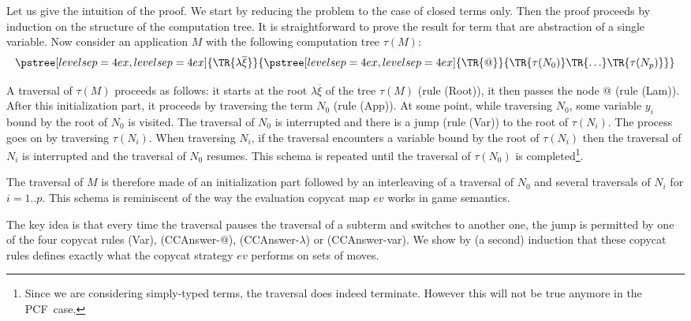 \documentclass{llncs}
\newcommand{\tree}[2][levelsep=4ex]{\pstree[levelsep=4ex,#1]{\TR{#2}}}
\newcommand\pcf{\textsf{PCF}}
\begin{document}
\begin{remark} Let us give the intuition of the proof.
    We start by reducing the problem to the case of closed terms only. Then the proof proceeds by induction on the structure of the computation tree.
    It is straightforward to prove the result for term that are abstraction of a single variable.
    Now consider an application $M$ with the following computation tree $\tau(M)$:
    $$ \tree[levelsep=4ex]{\lambda \overline{\xi}}
        { \tree[levelsep=4ex]{@}
            {   \TR{\tau(N_0)} \TR{\ldots} \TR{\tau(N_p)}}}
    $$

    A traversal of $\tau(M)$ proceeds as follows: it starts at the root $\lambda \overline{\xi}$ of the tree $\tau(M)$ (rule
    (Root)), it then passes the node @ (rule (Lam)).
    After this initialization part, it proceeds by traversing the term $N_0$ (rule (App)).
    At some point, while traversing $N_0$, some variable $y_i$ bound by the root of $N_0$ is visited. The traversal
    of $N_0$ is interrupted and there is a jump (rule (Var)) to the root of $\tau(N_i)$. The process goes on by traversing $\tau(N_i)$.
    When traversing $N_i$, if the traversal encounters a variable bound by the root of $\tau(N_i)$ then the traversal of $N_i$ is interrupted and
    the traversal of $N_0$ resumes.  This schema is repeated until the traversal of $\tau(N_0)$ is completed\footnote{Since we are considering
    simply-typed terms, the traversal does indeed terminate. However this will not be true anymore in the \pcf\ case.}.

    The traversal of $M$ is therefore made of an initialization part followed by an interleaving of a traversal of $N_0$ and
    several traversals of $N_i$ for $i=1..p$. This schema is reminiscent of the way the evaluation copycat map $ev$ works in game semantics.

    The key idea is that every time the traversal pauses the traversal of a subterm and switches to another one,
    the jump is permitted by one of the four copycat rules (Var), (CCAnswer-@), (CCAnswer-$\lambda$) or (CCAnswer-var).
    We show by (a second) induction that these copycat rules defines exactly what the copycat strategy $ev$ performs on sets of moves.


\end{remark}
\end{document}
